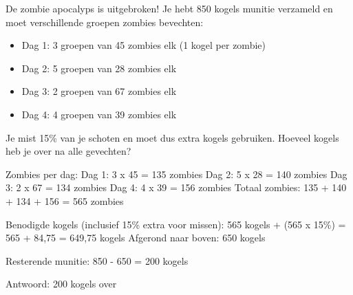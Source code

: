 \begin{opgave}
De zombie apocalyps is uitgebroken! Je hebt 850 kogels munitie verzameld en moet
verschillende groepen zombies bevechten:

\begin{itemize}
\item Dag 1: 3 groepen van 45 zombies elk (1 kogel per zombie)
\item Dag 2: 5 groepen van 28 zombies elk
\item Dag 3: 2 groepen van 67 zombies elk
\item Dag 4: 4 groepen van 39 zombies elk
\end{itemize}

Je mist 15\% van je schoten en moet dus extra kogels gebruiken. Hoeveel kogels
heb je over na alle gevechten?
\end{opgave}

\begin{oplossing}
Zombies per dag:
Dag 1: 3 x 45 = 135 zombies
Dag 2: 5 x 28 = 140 zombies
Dag 3: 2 x 67 = 134 zombies
Dag 4: 4 x 39 = 156 zombies
Totaal zombies: 135 + 140 + 134 + 156 = 565 zombies

Benodigde kogels (inclusief 15\% extra voor missen):
565 kogels + (565 x 15\%) = 565 + 84,75 = 649,75 kogels
Afgerond naar boven: 650 kogels

Resterende munitie: 850 - 650 = 200 kogels

Antwoord: 200 kogels over
\end{oplossing}